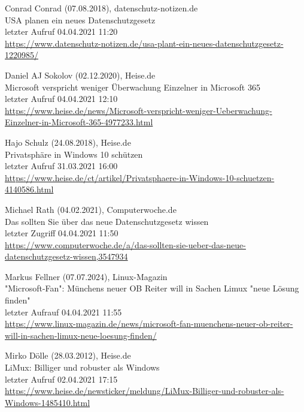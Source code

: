 \begin{thebibliography}{9}
    \bibitem{}
        Conrad Conrad (07.08.2018), datenschutz-notizen.de
        \\USA planen ein neues Datenschutzgesetz
        \\letzter Aufruf 04.04.2021 11:20
        \\\url{https://www.datenschutz-notizen.de/usa-plant-ein-neues-datenschutzgesetz-1220985/}

    \bibitem{}
        Daniel AJ Sokolov (02.12.2020), Heise.de
        \\Microsoft verspricht weniger Überwachung Einzelner in Microsoft 365
        \\letzter Aufruf 04.04.2021 12:10
        \\\url{https://www.heise.de/news/Microsoft-verspricht-weniger-Ueberwachung-Einzelner-in-Microsoft-365-4977233.html}

    \bibitem{}
        Hajo Schulz (24.08.2018), Heise.de
        \\Privatsphäre in Windows 10 schützen
        \\letzter Aufruf 31.03.2021 16:00
        \\\url{https://www.heise.de/ct/artikel/Privatsphaere-in-Windows-10-schuetzen-4140586.html}

    \bibitem{}
        Michael Rath (04.02.2021), Computerwoche.de
        \\Das sollten Sie über das neue Datenschutzgesetz wissen
        \\letzter Zugriff 04.04.2021 11:50
        \\\url{https://www.computerwoche.de/a/das-sollten-sie-ueber-das-neue-datenschutzgesetz-wissen,3547934}

    \bibitem{}
        Markus Fellner (07.07.2024), Linux-Magazin
        \\"Microsoft-Fan": Münchens neuer OB Reiter will in Sachen Limux "neue Lösung finden"
        \\letzter Aufrauf 04.04.2021 11:55
        \\\url{https://www.linux-magazin.de/news/microsoft-fan-muenchens-neuer-ob-reiter-will-in-sachen-limux-neue-loesung-finden/}

    \bibitem{}
        Mirko Dölle (28.03.2012), Heise.de
        \\LiMux: Billiger und robuster als Windows
        \\letzter Aufruf 02.04.2021 17:15
        \\\url{https://www.heise.de/newsticker/meldung/LiMux-Billiger-und-robuster-als-Windows-1485410.html}


\end{thebibliography}
